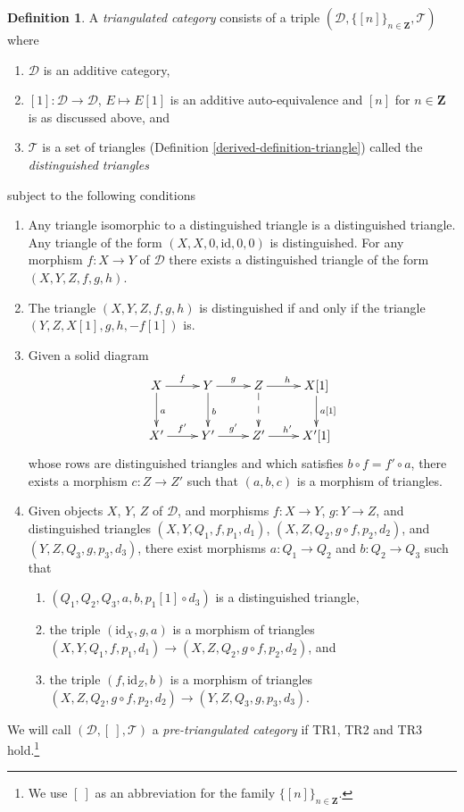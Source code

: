 \documentclass{amsart}
\theoremstyle{plain}
\theoremstyle{definition}
\newtheorem{definition}[subsection]{Definition}
\theoremstyle{remark}
\numberwithin{equation}{subsection}
\begin{document}
\begin{definition}
\label{derived-definition-triangulated-category}
A {\it triangulated category} consists of a triple
$(\mathcal{D}, \{[n]\}_{n\in \mathbf{Z}}, \mathcal{T})$
where
\begin{enumerate}
\item $\mathcal{D}$ is an additive category,
\item $[1] : \mathcal{D} \to \mathcal{D}$, $E \mapsto E[1]$
is an additive auto-equivalence and $[n]$ for $n \in \mathbf{Z}$ is
as discussed above, and
\item $\mathcal{T}$ is a set of triangles (Definition \ref{derived-definition-triangle})
called the {\it distinguished triangles}
\end{enumerate}
subject to the following conditions
\begin{enumerate}
\item[TR1] Any triangle isomorphic to a distinguished triangle is
a distinguished triangle. Any triangle of the form
$(X, X, 0, \text{id}, 0, 0)$ is distinguished.
For any morphism $f : X \to Y$ of $\mathcal{D}$ there exists a
distinguished triangle of the form $(X, Y, Z, f, g, h)$.
\item[TR2] The triangle $(X, Y, Z, f, g, h)$ is distinguished
if and only if the triangle $(Y, Z, X[1], g, h, -f[1])$ is.
\item[TR3] Given a solid diagram
$$
\xymatrix{
X \ar[r]^f \ar[d]^a &
Y \ar[r]^g \ar[d]^b &
Z \ar[r]^h \ar@{-->}[d] &
X[1] \ar[d]^{a[1]} \\
X' \ar[r]^{f'} &
Y' \ar[r]^{g'} &
Z' \ar[r]^{h'} &
X'[1]
}
$$
whose rows are distinguished triangles and which satisfies
$b \circ f = f' \circ a$, there exists a morphism
$c : Z \to Z'$ such that $(a, b, c)$ is a morphism of triangles.
\item[TR4] Given objects $X$, $Y$, $Z$ of $\mathcal{D}$, and morphisms
$f : X \to Y$, $g : Y \to Z$, and distinguished triangles
$(X, Y, Q_1, f, p_1, d_1)$,
$(X, Z, Q_2, g \circ f, p_2, d_2)$,
and
$(Y, Z, Q_3, g, p_3, d_3)$,
there exist
morphisms $a : Q_1 \to Q_2$ and $b : Q_2 \to Q_3$ such
that
\begin{enumerate}
\item $(Q_1, Q_2, Q_3, a, b, p_1[1] \circ d_3)$ is a
distinguished triangle,
\item the triple $(\text{id}_X, g, a)$ is
a morphism of triangles
$(X, Y, Q_1, f, p_1, d_1) \to (X, Z, Q_2, g \circ f, p_2, d_2)$, and
\item the triple $(f, \text{id}_Z, b)$ is a morphism of triangles
$(X, Z, Q_2, g \circ f, p_2, d_2) \to (Y, Z, Q_3, g, p_3, d_3)$.
\end{enumerate}
\end{enumerate}
We will call $(\mathcal{D}, [\ ], \mathcal{T})$ a
{\it pre-triangulated category} if TR1, TR2 and TR3
hold.\footnote{We use $[\ ]$ as an abbreviation for the
family $\{[n]\}_{n\in \mathbf{Z}}$.}
\end{definition}
\end{document}
